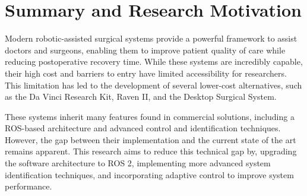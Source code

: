 \section{Summary and Research Motivation}

Modern robotic-assisted surgical systems provide a powerful framework to assist doctors and surgeons, enabling them to improve patient quality of care while reducing postoperative recovery time. While these systems are incredibly capable, their high cost and barriers to entry have limited accessibility for researchers. This limitation has led to the development of several lower-cost alternatives, such as the Da Vinci Research Kit, Raven II, and the Desktop Surgical System.

These systems inherit many features found in commercial solutions, including a ROS-based architecture and advanced control and identification techniques. However, the gap between their implementation and the current state of the art remains apparent. This research aims to reduce this technical gap by, upgrading the software architecture to ROS 2, implementing more advanced system identification techniques, and incorporating adaptive control to improve system performance.